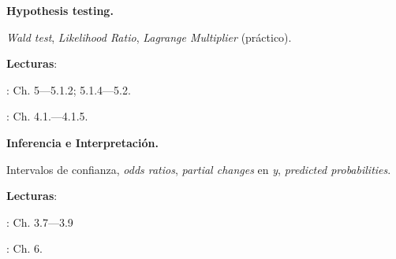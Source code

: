 \documentclass[letterpaper]{article}
\renewenvironment{itemize}{
  \begin{list}{}{
    \setlength{\leftmargin}{1.5em}
  }
}{
  \end{list}
}
\begin{document}
\begin{enumerate}[label=\roman*.]
     
       \begin{itemize} 
        \item[12.] {\bf Hypothesis testing.}
        \begin{itemize} 
          \item[$\circ$] \emph{} \emph{Wald test}, \emph{Likelihood Ratio}, \emph{Lagrange Multiplier} (pr\'actico).
          \item[$\circ$] {\bf Lecturas}: 
            \begin{itemize} 
              \item[$\diamond$] \textcite{Ward2018}: Ch. 5---5.1.2; 5.1.4---5.2.
              \item[$\diamond$] \textcite{Long2001}: Ch. 4.1.---4.1.5.
            \end{itemize}
        \end{itemize}
      \end{itemize}


        \begin{itemize} 
        \item[13.] {\bf Inferencia e Interpretaci\'on.}
        \begin{itemize} 
          \item[$\circ$] Intervalos de confianza, \emph{odds ratios}, \emph{partial changes} en \emph{y}, \emph{predicted probabilities}.
          \item[$\circ$] {\bf Lecturas}: 
            \begin{itemize} 
              \item[$\diamond$] \textcite{Long2001}: Ch. 3.7---3.9
              \item[$\diamond$] \textcite{Ward2018}: Ch. 6.
            \end{itemize}
        \end{itemize}
      \end{itemize}



\end{enumerate}
\end{document}
